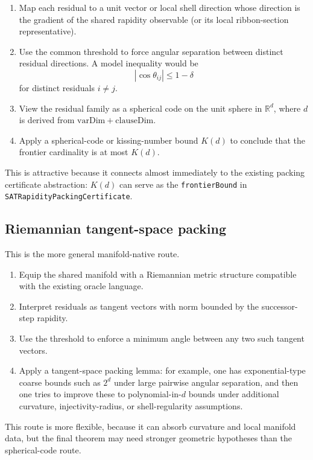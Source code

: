 \documentclass[11pt]{article}
\begin{document}
\begin{enumerate}[leftmargin=2em]
  \item Map each residual to a unit vector or local shell direction whose direction is the gradient of the
  shared rapidity observable (or its local ribbon-section representative).
  \item Use the common threshold to force angular separation between distinct
  residual directions. A model inequality would be
  \[
    |\cos \theta_{ij}| \leq 1 - \delta
  \]
  for distinct residuals \(i \neq j\).
  \item View the residual family as a spherical code on the unit sphere in
  \(\mathbb{R}^d\), where \(d\) is derived from
  \(\mathrm{varDim}+\mathrm{clauseDim}\).
  \item Apply a spherical-code or kissing-number bound \(K(d)\) to conclude that
  the frontier cardinality is at most \(K(d)\).
\end{enumerate}

This is attractive because it connects almost immediately to the existing packing
certificate abstraction: \(K(d)\) can serve as the \texttt{frontierBound} in
\texttt{SATRapidityPackingCertificate}.

\subsection{Riemannian tangent-space packing}

This is the more general manifold-native route.

\begin{enumerate}[leftmargin=2em]
  \item Equip the shared manifold with a Riemannian metric structure compatible
  with the existing oracle language.
  \item Interpret residuals as tangent vectors with norm bounded by the successor-step
  rapidity.
  \item Use the threshold to enforce a minimum angle between any two such tangent
  vectors.
  \item Apply a tangent-space packing lemma: for example, one has exponential-type
  coarse bounds such as \(2^d\) under large pairwise angular separation, and then one
  tries to improve these to polynomial-in-\(d\) bounds under additional curvature,
  injectivity-radius, or shell-regularity assumptions.
\end{enumerate}

This route is more flexible, because it can absorb curvature and local manifold data,
but the final theorem may need stronger geometric hypotheses than the spherical-code route.
\end{document}
